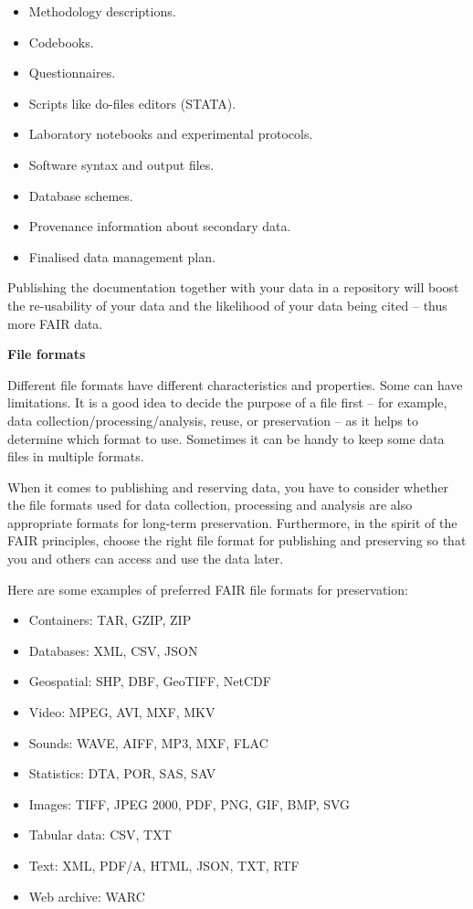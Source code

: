 \documentclass[
]{book}
\begin{document}
\begin{itemize}
\item
  Methodology descriptions.
\item
  Codebooks.
\item
  Questionnaires.
\item
  Scripts like do-files editors (STATA).
\item
  Laboratory notebooks and experimental protocols.
\item
  Software syntax and output files.
\item
  Database schemes.
\item
  Provenance information about secondary data.
\item
  Finalised data management plan.
\end{itemize}

Publishing the documentation together with your data in a repository will boost the re-usability of your data and the likelihood of your data being cited -- thus more FAIR data.

\textbf{File formats}

Different file formats have different characteristics and properties. Some can have limitations. It is a good idea to decide the purpose of a file first -- for example, data collection/processing/analysis, reuse, or preservation -- as it helps to determine which format to use. Sometimes it can be handy to keep some data files in multiple formats.

When it comes to publishing and reserving data, you have to consider whether the file formats used for data collection, processing and analysis are also appropriate formats for long-term preservation. Furthermore, in the spirit of the FAIR principles, choose the right file format for publishing and preserving so that you and others can access and use the data later.

Here are some examples of preferred FAIR file formats for preservation:

\begin{itemize}
\item
  Containers: TAR, GZIP, ZIP
\item
  Databases: XML, CSV, JSON
\item
  Geospatial: SHP, DBF, GeoTIFF, NetCDF
\item
  Video: MPEG, AVI, MXF, MKV
\item
  Sounds: WAVE, AIFF, MP3, MXF, FLAC
\item
  Statistics: DTA, POR, SAS, SAV
\item
  Images: TIFF, JPEG 2000, PDF, PNG, GIF, BMP, SVG
\item
  Tabular data: CSV, TXT
\item
  Text: XML, PDF/A, HTML, JSON, TXT, RTF
\item
  Web archive: WARC
\end{itemize}
\end{document}
